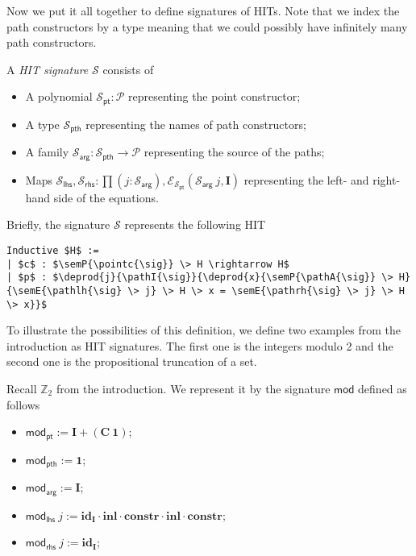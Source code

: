 \documentclass[9pt]{entcs}
\newcommand{\constructor}[1]{\mathbf{#1}}
\newcommand{\function}[1]{\mathsf{#1}}
\newcommand{\deprod}[3]{\prod(#1 : #2), #3} %
\newcommand{\0}{\textbf{0}} %
\newcommand{\unitt}{\textbf{1}} %
\newcommand{\Def}{:=} %
\newcommand{\poly}{\mathcal{P}} %
\newcommand{\C}{\constructor{C}} %
\newcommand{\I}{\constructor{I}} %
\newcommand{\sumP}[2]{#1 + #2} %
\newcommand{\ep}[3]{\mathcal{E}_{#1}(#2,#3)} %
\newcommand{\id}[1]{\constructor{id}_{#1}} %
\newcommand{\comp}[2]{#1 \cdot #2} %
\newcommand{\inle}{\constructor{inl}} %
\newcommand{\constr}{\constructor{constr}} %
\newcommand{\pt}[0]{\textsf{pt}}
\newcommand{\pthI}[0]{\textsf{pth}}
\newcommand{\pthA}[0]{\textsf{arg}}
\newcommand{\pthlh}[0]{\textsf{lhs}}
\newcommand{\pthrh}[0]{\textsf{rhs}}
\newcommand{\pointc}[1]{#1_{\pt}} %
\newcommand{\pathI}[1]{#1_{\pthI}} %
\newcommand{\pathA}[1]{#1_{\pthA}} %
\newcommand{\pathlh}[1]{#1_{\pthlh}} %
\newcommand{\pathrh}[1]{#1_{\pthrh}} %
\newcommand{\modsig}{\function{mod}} %
\newcommand{\sig}{\mathcal{S}} %
\newcommand{\semP}[1]{\llbracket #1 \rrbracket} %
\newcommand{\semE}[1]{\llbracket #1 \rrbracket} %
\newcommand{\modZ}{\mathbb{Z}_2} %
\begin{document}
Now we put it all together to define signatures of HITs.
Note that we index the path constructors by a type meaning that we could possibly have infinitely many path constructors.

\begin{definition}
\label{def:signature}
A \emph{HIT signature} $\sig$ consists of
\begin{itemize}
	\item A polynomial $\pointc{\sig} : \poly$ representing the point constructor;
	\item A type $\pathI{\sig}$ representing the names of path constructors;
	\item A family $\pathA{\sig} : \pathI{\sig} \rightarrow \poly$ representing the source of the paths;
	\item Maps $\pathlh{\sig}, \pathrh{\sig} : \deprod{j}{\pathA{\sig}}{\ep{\pointc{\sig}}{\pathA{\sig} \> j}{\I}}$ representing the left- and right-hand side of the equations.
\end{itemize}
\end{definition}

Briefly, the signature $\sig$ represents the following HIT

\begin{lstlisting}[mathescape=true]
Inductive $H$ :=
| $c$ : $\semP{\pointc{\sig}} \> H \rightarrow H$
| $p$ : $\deprod{j}{\pathI{\sig}}{\deprod{x}{\semP{\pathA{\sig}} \> H}{\semE{\pathlh{\sig} \> j} \> H \> x = \semE{\pathrh{\sig} \> j} \> H \> x}}$
\end{lstlisting}

To illustrate the possibilities of this definition, we define two examples from the introduction as HIT signatures.
The first one is the integers modulo 2 and the second one is the propositional truncation of a set.

\begin{example}
\label{ex:modsig}
Recall $\modZ$ from the introduction.
We represent it by the signature $\modsig$ defined as follows
\begin{itemize}
	\item $\pointc{\modsig} \Def \sumP{\I}{(\C \> \unitt)}$;
	\item $\pathI{\modsig} \Def \unitt$;
	\item $\pathA{\modsig} \Def \I$;
	\item $\pathlh{\modsig} \> j \Def \comp{\comp{\comp{\comp{\id{\I}}{\inle}}{\constr}}{\inle}}{\constr}$;
	\item $\pathrh{\modsig} \> j \Def \id{\I}$;
\end{itemize}
\end{example}
\end{document}
